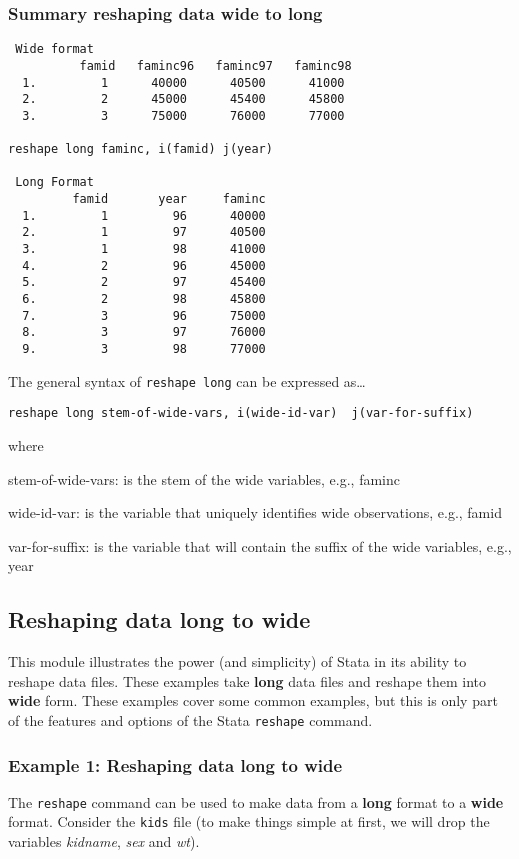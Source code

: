\subsubsection{Summary reshaping data wide to long}

\begin{lstlisting}
 Wide format
          famid   faminc96   faminc97   faminc98
  1.         1      40000      40500      41000
  2.         2      45000      45400      45800
  3.         3      75000      76000      77000

reshape long faminc, i(famid) j(year)

 Long Format
         famid       year     faminc
  1.         1         96      40000
  2.         1         97      40500
  3.         1         98      41000
  4.         2         96      45000
  5.         2         97      45400
  6.         2         98      45800
  7.         3         96      75000
  8.         3         97      76000
  9.         3         98      77000
\end{lstlisting}

The general syntax of \lstinline{reshape long} can be expressed as\ldots

\begin{lstlisting}
reshape long stem-of-wide-vars, i(wide-id-var)  j(var-for-suffix)
\end{lstlisting}
where
\begin{compactitem}
\item stem-of-wide-vars: is the stem of the wide variables, e.g., faminc
\item wide-id-var: is the variable that uniquely identifies wide observations, e.g., famid
\item var-for-suffix: is the variable that will contain the suffix of the wide variables, e.g., year
\end{compactitem}


\subsection{Reshaping data long to wide}

This module illustrates the power (and simplicity) of Stata in its ability to reshape data files. These examples take \textbf{long} data files and reshape them into \textbf{wide} form. These examples cover some common examples, but this is only part of the features and options of the Stata \lstinline{reshape} command.

\subsubsection{Example 1: Reshaping data long to wide}
The \lstinline{reshape} command can be used to make data from a \textbf{long} format to a \textbf{wide} format. Consider the \lstinline{kids} file (to make things simple at first, we will drop the variables \textit{kidname}, \textit{sex} and \textit{wt}).

